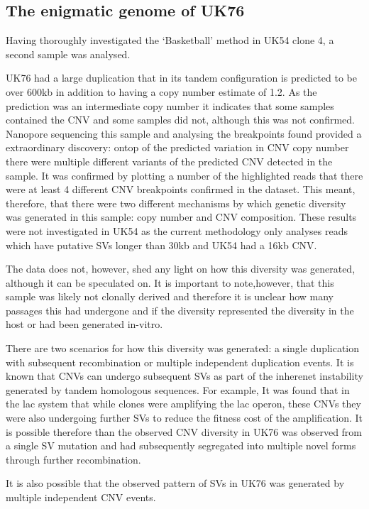 \documentclass{article}
\begin{document}
 
\subsection{The enigmatic genome of UK76}
Having thoroughly investigated the `Basketball' method in UK54 clone 4, a second sample was analysed.

UK76 had a large duplication that in its tandem configuration is predicted to be over 600kb in addition to having a copy number estimate of 1.2. As the prediction was an intermediate copy number it indicates that some samples contained the CNV and some samples did not, although this was not confirmed. Nanopore sequencing this sample and analysing the breakpoints found provided a extraordinary discovery: ontop of the predicted variation in CNV copy number there were multiple different variants of the predicted CNV detected in the sample. It was confirmed by plotting a number of the highlighted reads that there were at least 4 different CNV breakpoints confirmed in the dataset.   This meant, therefore, that there were two different mechanisms by which genetic diversity was generated in this sample: copy number and CNV composition. These results were not investigated in UK54 as the current methodology only analyses reads which have putative SVs longer than 30kb and UK54 had a 16kb CNV. 


The data does not, however, shed any light on how this diversity was generated, although it can be speculated on. It is important to note,however,  that this sample was likely not clonally derived and therefore it is unclear how many passages this had undergone and if the diversity represented the diversity in the host or had been generated in-vitro.


There are two scenarios for how this diversity was generated: a single duplication with subsequent recombination or multiple independent duplication events. It is known that  CNVs can undergo subsequent SVs as part of the inherenet instability generated by tandem homologous sequences. For example,  It was found that in the lac system that while clones were amplifying the lac operon, these CNVs they were also undergoing further SVs to reduce the fitness cost of the amplification. It is possible therefore than the observed CNV diversity in UK76 was observed from a single SV mutation and had subsequently segregated into multiple novel forms through further recombination. 

It is also possible that the observed pattern of SVs in UK76 was generated by multiple independent CNV events.
\end{document}
